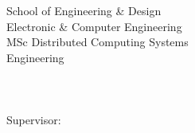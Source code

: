\begin{titlepage}
    \begin{center}
        \large  
		\vspace*{1cm}
		{School of Engineering \& Design}\\
		{Electronic \& Computer Engineering}\\
		\vspace{1.2cm}
		{MSc Distributed Computing Systems}\\
		{Engineering}\\
		\vspace{2cm}
		\huge
		{\myUni}\\
		\vspace{2.5cm}
		\Huge
		\begingroup
			\color{Maroon}{\myTitle}\\
		\endgroup	
		\vspace{4.5cm}
		\large
		{\myName}\\
		\vspace{1cm}
		{Supervisor: \mySupervisor}\\
		\vspace{1cm}
		{\myTime}\\
		
		\normalsize

    \end{center}        
\end{titlepage}